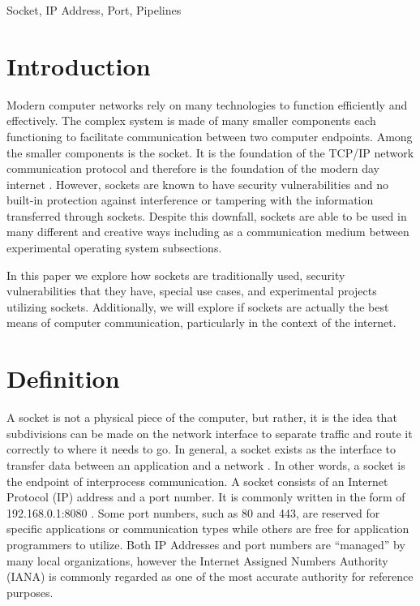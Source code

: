 \documentclass[conference, 12pt]{IEEEtran}
\begin{document}
\begin{IEEEkeywords}
Socket, IP Address, Port, Pipelines
\end{IEEEkeywords}

\section{Introduction}
Modern computer networks rely on many technologies to function efficiently and effectively. The complex system is made of many smaller components each functioning to facilitate communication between two computer endpoints. Among the smaller components is the socket. It is the foundation of the TCP/IP network communication protocol and therefore is the foundation of the modern day internet \cite{hoffmans}. However, sockets are known to have security vulnerabilities and no built-in protection against interference or tampering with the information transferred through sockets. Despite this downfall, sockets are able to be used in many different and creative ways including as a communication medium between experimental operating system subsections.

In this paper we explore how sockets are traditionally used, security vulnerabilities that they have, special use cases, and experimental projects utilizing sockets. Additionally, we will explore if sockets are actually the best means of computer communication, particularly in the context of the internet.

\section{Definition}
A socket is not a physical piece of the computer, but rather, it is the idea that subdivisions can be made on the network interface to separate traffic and route it correctly to where it needs to go. In general, a socket exists as the interface to transfer data between an application and a network \cite{sawant2013network}. In other words, a socket is the endpoint of interprocess communication. A socket consists of an Internet Protocol (IP) address and a port number. It is commonly written in the form of 192.168.0.1:8080 \cite{goralski2017illustrated}. Some port numbers, such as 80 and 443, are reserved for specific applications or communication types while others are free for application programmers to utilize. Both IP Addresses and port numbers are “managed” by many local organizations, however the Internet Assigned Numbers Authority (IANA) is commonly regarded as one of the most accurate authority for reference purposes.
\end{document}
